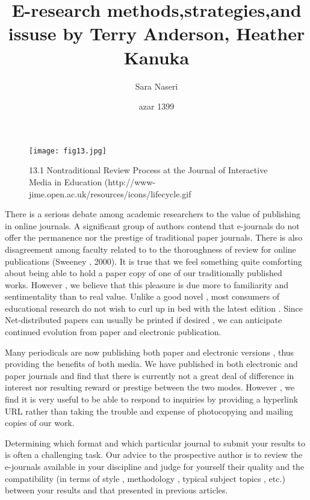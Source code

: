 \documentclass{article}
\title{E-research methods,strategies,and issuse by Terry Anderson, Heather Kanuka}
\author{Sara Naseri}
\date{azar 1399}
\begin{document}
\maketitle

\begin{figure}[htp]
    \centering
    \texttt{[image: fig13.jpg]}
    \caption{ 13.1 Nontraditional Review Process at the Journal of Interactive Media in Education (http://www-jime.open.ac.uk/resources/icons/lifecycle.gif  }
    \label{fig:13.1}
\end{figure}

There is a serious debate among academic researchers to the value of publishing in online journals. A significant group of authors contend that e-journals do not offer the permanence nor the prestige of traditional paper journals. There is also disagreement among faculty related to to the thoroughness of review for online publications (Sweeney , 2000). It is true that we feel something quite comforting about being able to hold a paper copy of one of our traditionally published works. However , we believe that this pleasure is due more to familiarity and sentimentality than to real value. Unlike a good novel , most consumers of educational research do not wish to curl up in bed with the latest edition . Since Net-distributed papers can usually be printed if desired , we can anticipate continued evolution from paper and electronic publication.

Many periodicals are now publishing both paper and electronic versions , thus providing the benefits of both media. We have published in both electronic and paper journals and find that there is currently not a great deal of difference in interest nor resulting reward or prestige between the two modes. However , we find it is very useful to be able to respond to inquiries by providing a hyperlink URL rather than taking the trouble and expense of photocopying and mailing copies of our work.

Determining which format and which particular journal to submit your results to is often a challenging task. Our advice to the prospective author is to review the e-journals available in your discipline and judge for yourself their quality and the compatibility (in terms of style , methodology , typical subject topics , etc.) between your results and that presented in previous articles.
\end{document}
